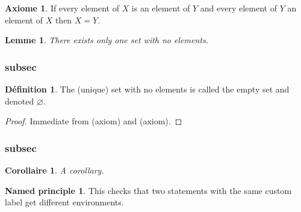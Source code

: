 \documentclass[
]{article}
\theoremstyle{definition}
\theoremstyle{plain}
\theoremstyle{empty}
\theoremstyle{definition}
\theoremstyle{plain}
\theoremstyle{definition}
\newtheorem{axiom}[theorem]{Axiome}
\theoremstyle{plain}
\newtheorem{lemma}[theorem]{Lemme}
\theoremstyle{definition}
\newtheorem{definition}[theorem]{Définition}
\theoremstyle{plain}
\newtheorem{corollary}{Corollaire}[subsubsection]
\theoremstyle{definition}
\newtheorem*{named_principle}{Named principle}
\begin{document}
\begin{axiom}

\protect\hypertarget{sta:extensionality}{}{}If every element of \(X\) is
an element of \(Y\) and every element of \(Y\) an element of \(X\) then
\(X=Y\).

\end{axiom}

\begin{lemma}

There exists only one set with no elements.

\end{lemma}

\hypertarget{subsec-1}{%
\subsubsection{subsec}\label{subsec-1}}

\begin{definition}

The (unique) set with no elements is called the empty set and denoted
\(\varnothing\).

\end{definition}

\begin{proof}

Immediate from (axiom) and (axiom).

\end{proof}

\hypertarget{subsec-2}{%
\subsubsection{subsec}\label{subsec-2}}

\begin{corollary}

A corollary.

\end{corollary}

\begin{named_principle}

\protect\hypertarget{named-principle}{}{}This checks that two statements
with the same custom label get different environments.

\end{named_principle}
\end{document}
